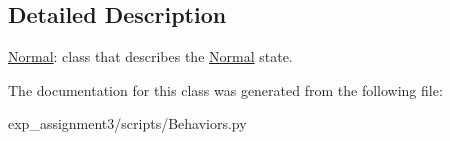 \subsection{Detailed Description}
\hyperlink{classBehaviors_1_1Normal}{Normal}\+: class that describes the \hyperlink{classBehaviors_1_1Normal}{Normal} state. 

The documentation for this class was generated from the following file\+:\begin{DoxyCompactItemize}
\item 
exp\+\_\+assignment3/scripts/Behaviors.\+py\end{DoxyCompactItemize}
